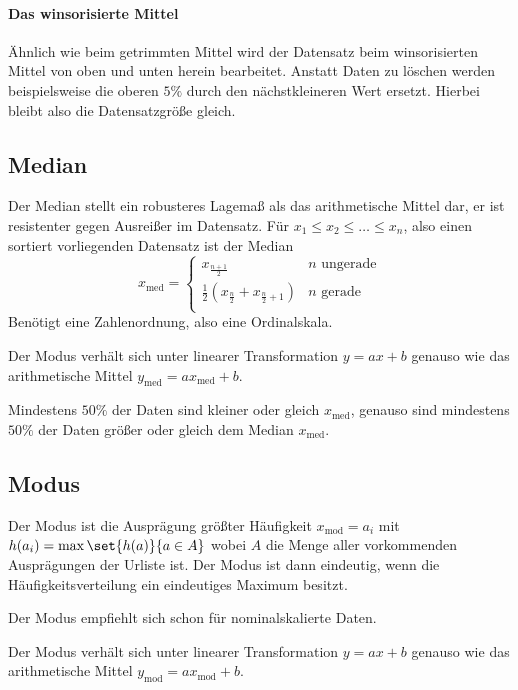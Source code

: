 \paragraph{Das winsorisierte Mittel}
Ähnlich wie beim getrimmten Mittel wird der Datensatz beim winsorisierten Mittel von oben und unten herein bearbeitet. Anstatt Daten zu löschen werden beispielsweise die oberen $5\%$ durch den nächstkleineren Wert ersetzt. Hierbei bleibt also die Datensatzgröße gleich.

\subsection{Median}
Der Median stellt ein robusteres Lagemaß als das arithmetische Mittel dar, er ist resistenter gegen Ausreißer im Datensatz.
Für $x_1\leq x_2\leq\ldots\leq x_n$, also einen sortiert vorliegenden Datensatz ist der Median
\begin{equation*}
	x_{\operatorname{med}}=
	\begin{cases}
		x_{\frac{n+1}2}& \text{$n$ ungerade}\\
		\frac 12 (x_{\frac n2}+x_{\frac n2 +1})& \text{$n$ gerade}\\
	\end{cases}
\end{equation*}
Benötigt eine Zahlenordnung, also eine Ordinalskala.

Der Modus verhält sich unter linearer Transformation $y=ax+b$ genauso wie das arithmetische Mittel $y_{\operatorname{med}}=ax_{\operatorname{med}}+b$.

Mindestens $50\%$ der Daten sind kleiner oder gleich $x_{\operatorname{med}}$, genauso sind mindestens $50\%$ der Daten größer oder gleich dem Median $x_{\operatorname{med}}$.

\subsection{Modus}
Der Modus ist die Ausprägung größter Häufigkeit $x_{\operatorname{mod}}=a_i$ mit $h(a_i)=\max \set{h(a)}{a\in A}$ wobei $A$ die Menge aller vorkommenden Ausprägungen der Urliste ist.
Der Modus ist dann eindeutig, wenn die Häufigkeitsverteilung ein eindeutiges Maximum besitzt.

Der Modus empfiehlt sich schon für nominalskalierte Daten.

Der Modus verhält sich unter linearer Transformation $y=ax+b$ genauso wie das arithmetische Mittel $y_{\operatorname{mod}}=ax_{\operatorname{mod}}+b$.




